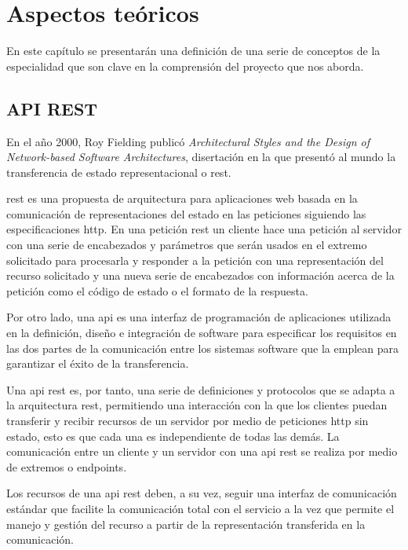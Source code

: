 \chapter{Aspectos teóricos}
\label{ch:aspectos_teoricos}

En este capítulo se presentarán una definición de una serie de conceptos de la especialidad que son clave en la comprensión del proyecto que nos aborda.

\section{API REST}

En el año 2000, Roy Fielding publicó \emph{Architectural Styles and the Design of Network-based Software Architectures}\cite{fielding2000architectural}, disertación en la que presentó al mundo la transferencia de estado representacional o \acrshort{rest}.

\acrshort{rest} es una propuesta de arquitectura para aplicaciones web basada en la comunicación de representaciones del estado en las peticiones siguiendo las especificaciones \acrshort{http}. En una petición \acrshort{rest} un cliente hace una petición al servidor con una serie de encabezados y parámetros que serán usados en el extremo solicitado para procesarla y responder a la petición con una representación del recurso solicitado y una nueva serie de encabezados con información acerca de la petición como el código de estado o el formato de la respuesta.

Por otro lado, una \acrshort{api} es una interfaz de programación de aplicaciones utilizada en la definición, diseño e integración de software para especificar los requisitos en las dos partes de la comunicación entre los sistemas software que la emplean para garantizar el éxito de la transferencia.

Una \acrshort{api} \acrshort{rest} es, por tanto, una serie de definiciones y protocolos que se adapta a la arquitectura \acrshort{rest}, permitiendo una interacción con la que los clientes puedan transferir y recibir recursos de un servidor por medio de peticiones \acrshort{http} sin estado, esto es que cada una es independiente de todas las demás. La comunicación entre un cliente y un servidor con una \acrshort{api} \acrshort{rest} se realiza por medio de extremos o \glspl{endpoint}.

Los recursos de una \acrshort{api} \acrshort{rest} deben, a su vez, seguir una interfaz de comunicación estándar que facilite la comunicación total con el servicio a la vez que permite el manejo y gestión del recurso a partir de la representación transferida en la comunicación.

